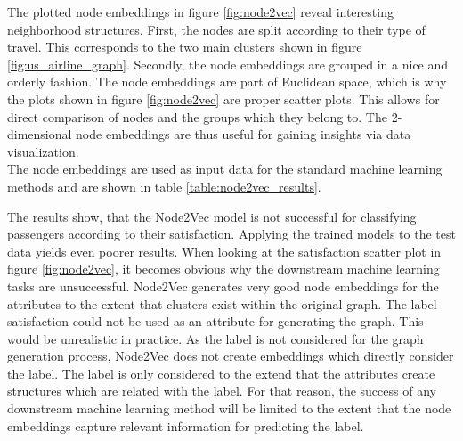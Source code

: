   \noindent The plotted node embeddings in figure \ref{fig:node2vec} reveal 
  interesting neighborhood structures. First, the nodes are split according to
  their type of travel. This corresponds to the two main clusters shown in
  figure \ref{fig:us_airline_graph}. Secondly, the node embeddings are grouped 
  in a nice and orderly fashion. The node embeddings are part of Euclidean
  space, which is why the plots shown in figure \ref{fig:node2vec} are proper
  scatter plots. This allows for direct comparison of nodes and the groups
  which they belong to. The 2-dimensional node embeddings are thus useful for
  gaining insights via data visualization.\\

  \noindent The node embeddings are used as input data for the standard machine 
  learning methods and are shown in table \ref{table:node2vec_results}.

  \begin{table}[h]
    \centering
    \caption{Node2Vec Classification Results}
    \label{table:node2vec_results}
  \end{table}

  \noindent The results show, that the Node2Vec model is not successful for
  classifying passengers according to their satisfaction. Applying the trained
  models to the test data yields even poorer results. When looking at the
  satisfaction scatter plot in figure \ref{fig:node2vec}, it becomes obvious why
  the downstream machine learning tasks are unsuccessful. Node2Vec generates
  very good node embeddings for the attributes to the extent that clusters exist
  within the original graph. The label satisfaction could not be used as an 
  attribute for generating the graph. This would be unrealistic in practice. 
  As the label is not considered for the graph generation process, Node2Vec 
  does not create embeddings which directly consider the label. The label is 
  only considered to the extend that the attributes create structures 
  which are related with the label. For that reason, the success of any 
  downstream machine learning method will be limited to the extent that the node 
  embeddings capture relevant information for predicting the label. \\


